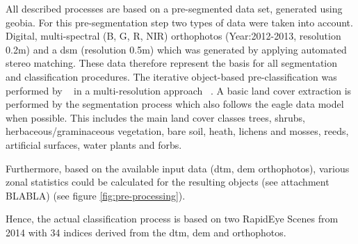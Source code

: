 \documentclass[authoryear,review,12pt,number]{elsarticle}
\begin{document}
All described processes are based on a pre-segmented data set, generated using
\gls{geobia}. For this pre-segmentation step two types of data were taken into
account. Digital, multi-spectral (B, G, R, NIR) orthophotos (Year:2012-2013,
resolution 0.2m) and a \gls{dsm} (resolution 0.5m) which was generated by applying
automated stereo matching. These data therefore represent the basis for all
segmentation and classification procedures. 
The iterative object-based pre-classification was performed by
~\cite{Tintrup2015} in a multi-resolution
approach ~\citep{baatz2001ecognition}. A basic land cover extraction is performed by the
segmentation process which also follows the \gls{eagle} data model when
possible. This includes the main land cover classes trees, shrubs,
herbaceous/graminaceous vegetation, bare soil, heath, lichens and
mosses, reeds, artificial surfaces, water plants and forbs.

Furthermore, based on the available input data (\gls{dtm}, \gls{dem}
orthophotos), various zonal statistics could be calculated for the resulting
objects (see attachment BLABLA) (see figure \ref{fig:pre-processing}).




Hence, the actual classification process is based on two RapidEye Scenes from 
2014 with 34 indices derived from the \gls{dtm}, \gls{dem} and orthophotos. 
\end{document}
